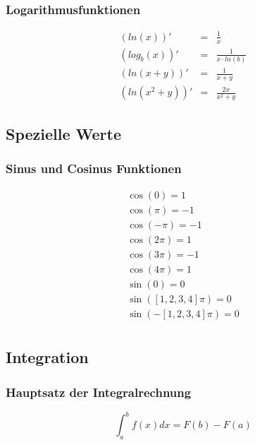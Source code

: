\subsubsection{Logarithmusfunktionen}
\label{ssub:logarithmusfunktionen}	
\begin{eqnarray}
	(ln(x))' &=& \frac{1}{x} \\
	(log_b(x))' &=& \frac{1}{x \cdot ln(b)}\\
	(ln(x+y))' &=& \frac{1}{x+y} \\
	(ln(x^2+y))' &=& \frac{2x}{x^2+y}
\end{eqnarray}

\subsection{Spezielle Werte} %
\label{sub:spezielle_werte}
\subsubsection{Sinus und Cosinus Funktionen} %
\label{ssub:sinus_und_cosinus_funktion}
\begin{eqnarray}
  \cos(0) = 1\\
  \cos(\pi) = -1\\
  \cos(-\pi)= -1\\
  \cos(2\pi) = 1\\
  \cos(3\pi) = -1\\
  \cos(4\pi) = 1\\
  \sin(0) = 0\\
  \sin([1,2,3,4]\pi) = 0\\
  \sin(-[1,2,3,4]\pi) = 0\\
\end{eqnarray}


\subsection{Integration} 
\label{sub:integration}

\subsubsection{Hauptsatz der Integralrechnung} 
\label{ssub:hauptsatz_der_integralrechnung}

\begin{equation}
	\int_a^b f(x)dx = F(b) - F(a)
\end{equation}

